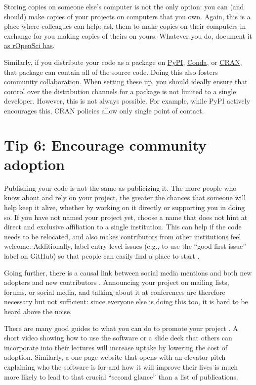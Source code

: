 \documentclass[10pt,letterpaper]{article}
\begin{document}
Storing copies on someone else's computer is not the only option:
you can (and should) make copies of your projects on computers that you own.
Again,
this is a place where colleagues can help:
ask them to make copies on their computers in exchange for you making copies of theirs on yours.
Whatever you do,
document it \href{https://ropensci.org/blog/2022/03/22/safeguards-and-backups-for-github-organizations/}{as rOpenSci has}.

Similarly,
if you distribute your code as a package on \href{https://pypi.org/}{PyPI},
\href{https://anaconda.org/anaconda/conda}{Conda},
or \href{https://cran.r-project.org/}{CRAN},
that package can contain all of the source code.
Doing this also fosters community collaboration.
When setting these up, you should ideally ensure that control over the distribution channels for a package is not limited to a single developer.
However, this is not always possible.
For example, while PyPI actively encourages this, CRAN policies allow only single point of contact.

\section*{Tip 6: Encourage community adoption}

Publishing your code is not the same as publicizing it.
The more people who know about and rely on your project,
the greater the chances that someone will help keep it alive,
whether by working on it directly or supporting you in doing so.
If you have not named your project yet,
choose a name that does not hint at direct and exclusive affiliation to a single institution.
This can help if the code needs to be relocated,
and also makes contributors from other institutions feel welcome.
Additionally,
label entry-level issues
(e.g., to use the ``good first issue'' label on GitHub)
so that people can easily find a place to start \cite{Steinmacher2015}.

Going further,
there is a causal link between social media mentions and both new adopters and new contributors \cite{Fang2022}.
Announcing your project on mailing lists, forums, or social media,
and talking about it at conferences are therefore necessary but not sufficient:
since everyone else is doing this too,
it is hard to be heard above the noise.

There are many good guides to what you can do to promote your project \cite{Kuchner2011,BelliniSaibene2024}.
A short video showing how to use the software
or a slide deck that others can incorporate into their lectures
will increase uptake by lowering the cost of adoption.
Similarly,
a one-page website that opens with an elevator pitch
explaining who the software is for
and how it will improve their lives
is much more likely to lead to that crucial ``second glance''
than a list of publications.
\end{document}
